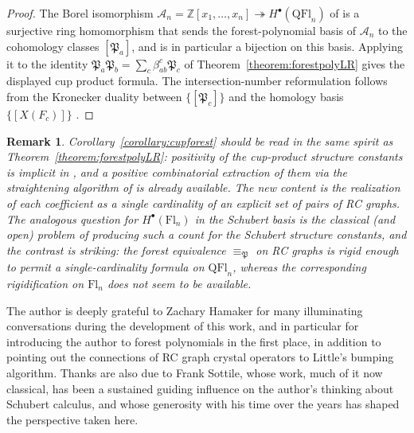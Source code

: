 \documentclass[pdflatex,sn-mathphys-num]{sn-jnl}
\numberwithin{equation}{subsection}
\newcommand{\coma}{\mathcal{A}}
\newcommand{\forest}{\mathfrak{P}}
\theoremstyle{thmstyleone}
\theoremstyle{thmstylethree}
\theoremstyle{thmstyletwo}
\newtheorem*{remark}{Remark}
\begin{document}
\begin{proof}
The Borel isomorphism $\coma_n=\mathbb{Z}[x_1,\ldots,x_n]\twoheadrightarrow H^\bullet(\mathrm{QFl}_n)$ of \cite[Theorem~A and Corollary~12.5]{bergeron2025qsymflag} is a surjective ring homomorphism that sends the forest-polynomial basis of $\coma_n$ to the cohomology classes $[\forest_a]$, and is in particular a bijection on this basis. Applying it to the identity $\forest_a\forest_b = \sum_c \beta_{ab}^c \forest_c$ of Theorem~\ref{theorem:forestpolyLR} gives the displayed cup product formula. The intersection-number reformulation follows from the Kronecker duality between $\{[\forest_c]\}$ and the homology basis $\{[X(F_c)]\}$ \cite[Theorem~12.12]{bergeron2025qsymflag}.
\end{proof}

\begin{remark}
Corollary~\ref{corollary:cupforest} should be read in the same spirit as Theorem~\ref{theorem:forestpolyLR}: positivity of the cup-product structure constants is implicit in \cite{bergeron2025equivariant,bergeron2025qsymflag}, and a positive combinatorial extraction of them via the straightening algorithm of \cite{bergeron2025equivariant} is already available. The new content is the realization of each coefficient as a single cardinality of an explicit set of pairs of RC graphs. The analogous question for $H^\bullet(\mathrm{Fl}_n)$ in the Schubert basis is the classical (and open) problem of producing such a count for the Schubert structure constants, and the contrast is striking: the forest equivalence $\equiv_\forest$ on RC graphs is rigid enough to permit a single-cardinality formula on $\mathrm{QFl}_n$, whereas the corresponding rigidification on $\mathrm{Fl}_n$ does not seem to be available.
\end{remark}

\backmatter


The author is deeply grateful to Zachary Hamaker for many illuminating conversations during the development of this work, and in particular for introducing the author to forest polynomials in the first place, in addition to pointing out the connections of RC graph crystal operators to  Little's bumping algorithm. Thanks are also due to Frank Sottile, whose work, much of it now classical, has been a sustained guiding influence on the author's thinking about Schubert calculus, and whose generosity with his time over the years has shaped the perspective taken here.
\end{document}
